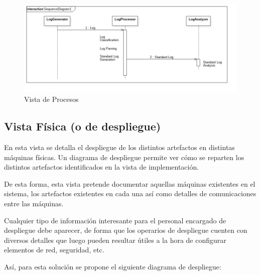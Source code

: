 \documentclass[11pt]{article}
\begin{document}
\begin{center}
 \begin{figure}[H]
 \begin{center}
   \includegraphics[width=16cm]{img/process_view00.png}
   \caption{Vista de Procesos}
   \label{fig:4plus1views}
 \end{center}
 \end{figure}
\end{center}

\subsection{Vista Física (o de despliegue)}
En esta vista se detalla el despliegue de los distintos artefactos en distintas máquinas físicas. Un diagrama de despliegue permite ver cómo se reparten los distintos artefactos identificados en la vista de implementación.

De esta forma, esta vista pretende documentar aquellas máquinas existentes en el sistema, los artefactos existentes en cada una así como detalles de comunicaciones entre las máquinas.

Cualquier tipo de información interesante para el personal encargado de despliegue debe aparecer, de forma que los operarios de despliegue cuenten con diversos detalles que luego pueden resultar útiles a la hora de configurar elementos de red, seguridad, etc.

Así, para esta solución se propone el siguiente diagrama de despliegue:
\end{document}
